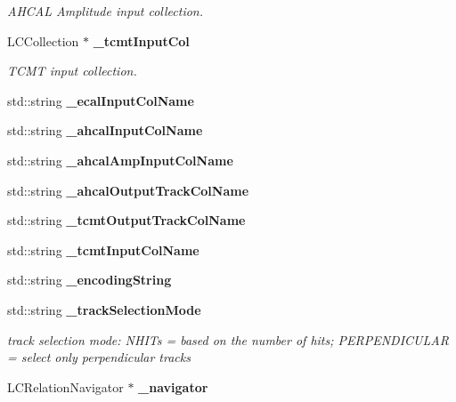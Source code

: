 \begin{DoxyCompactItemize}
\begin{DoxyCompactList}\small\item\em A\-H\-C\-A\-L Amplitude input collection. \end{DoxyCompactList}\item 
L\-C\-Collection $\ast$ {\bf \-\_\-tcmt\-Input\-Col}\label{classCALICE_1_1AngleTrackFinder_a961a3ce5cad59157ae7cc350da27017b}

\begin{DoxyCompactList}\small\item\em T\-C\-M\-T input collection. \end{DoxyCompactList}\item 
std\-::string {\bfseries \-\_\-ecal\-Input\-Col\-Name}\label{classCALICE_1_1AngleTrackFinder_aa226f88b009a6d2f77c4b8c863579ac1}

\item 
std\-::string {\bfseries \-\_\-ahcal\-Input\-Col\-Name}\label{classCALICE_1_1AngleTrackFinder_af139ab1be231e5e7daa0d72c3b05ce27}

\item 
std\-::string {\bfseries \-\_\-ahcal\-Amp\-Input\-Col\-Name}\label{classCALICE_1_1AngleTrackFinder_a00c257e37403fb1209fcded626033de5}

\item 
std\-::string {\bfseries \-\_\-ahcal\-Output\-Track\-Col\-Name}\label{classCALICE_1_1AngleTrackFinder_afcc15eae818bff82cb07f8a206b4eb6b}

\item 
std\-::string {\bfseries \-\_\-tcmt\-Output\-Track\-Col\-Name}\label{classCALICE_1_1AngleTrackFinder_afc39c68fdbd2e58a0ae729952f6c307e}

\item 
std\-::string {\bfseries \-\_\-tcmt\-Input\-Col\-Name}\label{classCALICE_1_1AngleTrackFinder_af55dd53460826abc6abe7eb4917f201b}

\item 
std\-::string {\bfseries \-\_\-encoding\-String}\label{classCALICE_1_1AngleTrackFinder_aec98c28c81cf10cb1fd7d83bbe560120}

\item 
std\-::string {\bf \-\_\-track\-Selection\-Mode}\label{classCALICE_1_1AngleTrackFinder_a9e65faf8074db90de8771bc2dccf072c}

\begin{DoxyCompactList}\small\item\em track selection mode\-: N\-H\-I\-Ts = based on the number of hits; P\-E\-R\-P\-E\-N\-D\-I\-C\-U\-L\-A\-R = select only perpendicular tracks \end{DoxyCompactList}\item 
L\-C\-Relation\-Navigator $\ast$ {\bfseries \-\_\-navigator}\label{classCALICE_1_1AngleTrackFinder_adb33fe8149d97611b8eb62037138f972}


\end{DoxyCompactItemize}
